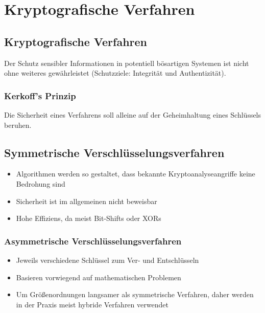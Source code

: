\section{Kryptografische Verfahren}

\subsection{Kryptografische Verfahren}
Der Schutz sensibler Informationen in potentiell bösartigen Systemen ist nicht ohne weiteres gewährleistet (Schutzziele: Integrität und Authentizität).

\subsubsection{Kerkoff's Prinzip}
Die Sicherheit eines Verfahrens soll alleine auf der Geheimhaltung eines Schlüssels beruhen.

\subsection{Symmetrische Verschlüsselungsverfahren}
\begin{itemize}
	\item Algorithmen werden so gestaltet, dass bekannte Kryptoanalyseangriffe keine Bedrohung sind
	\item Sicherheit ist im allgemeinen nicht beweisbar
	\item Hohe Effiziens, da meist Bit-Shifts oder XORs
\end{itemize}

\subsubsection{Asymmetrische Verschlüsselungsverfahren}
\begin{itemize}
	\item Jeweils verschiedene Schlüssel zum Ver- und Entschlüsseln
	\item Basieren vorwiegend auf mathematischen Problemen
	\item Um Größenordnungen langsamer als symmetrische Verfahren, daher werden in der Praxis meist hybride Verfahren verwendet
\end{itemize}

